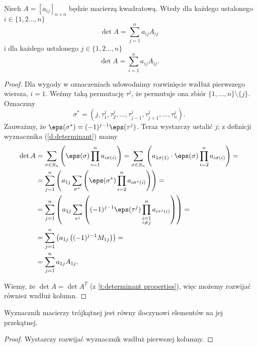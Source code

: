 \begin{theorem}
    \label{t:Laplace}
    Niech $A = [a_{ij}]_{n\times n}$ będzie macierzą kwadratową. Wtedy dla każdego ustalonego $i \in \{1,2\ldots,n\}$
    \[ \det A = \sum_{j=1}^n a_{ij}A_{ij} \]
    i dla każdego ustalonego $j \in \{1,2\ldots,n\}$
    \[ \det A = \sum_{i=1}^n a_{ij}A_{ij}. \]
\end{theorem}
\begin{proof}
    Dla wygody w oznaczeniach udowodnimy rozwinięcie wzdłuż pierwszego wiersza, $i = 1$. Weźmy taką permutację $\tau^j$, że permutuje ona zbiór $\{1, \ldots, n\} \setminus \{j\}$. Oznaczmy
    \[ \sigma^* = (j, \tau^j_1, \tau^j_2, \ldots, \tau^j_{j-1}, \tau^j_{j+1}, \ldots, \tau^j_{n}). \]
    Zauważmy, że $\eps(\sigma^*) = (-1)^{j-1} \eps(\tau^j)$. Teraz wystarczy ustalić $j$; z definicji wyznacznika (\ref{d:determinant}) mamy
    \begin{align*}
        \det A &= \sum_{\sigma\in S_n} \left(\eps(\sigma) \prod_{i=1}^n a_{i\sigma(i)}\right) = \sum_{\sigma\in S_n} \left(a_{1\sigma(1)} \cdot \eps(\sigma) \prod_{i=2}^n a_{i\sigma(i)}\right) = \\
        &= \sum_{j=1}^n \left(a_{1j} \sum_{\sigma^*} \left(\eps(\sigma^*) \prod_{i=2}^n a_{i\sigma^*(i)}\right)\right) = \\
        &= \sum_{j=1}^n \left(a_{1j} \sum_{\tau^j} \left((-1)^{j-1}\eps(\tau^j) \prod_{\substack{i=1\\i\neq j}}^n a_{i\tau^j(i)}\right)\right) = \\
        &= \sum_{j=1}^n \left(a_{1j} \left((-1)^{j-1} M_{1j}\right)\right) = \\
        &= \sum_{j=1}^n a_{1j} A_{1j}.
    \end{align*}

    Wiemy, że $\det A = \det A^T$ (z \ref{t:determinant properties}), więc możemy rozwijać również wzdłuż kolumn.
\end{proof}

\begin{corollary}
    \label{c:determinant in triangular matrix}
    Wyznacznik macierzy trójkątnej jest równy iloczynowi elementów na jej przekątnej.
\end{corollary}
\begin{proof}
    Wystarczy rozwijać wyznacznik wzdłuż pierwszej kolumny.
\end{proof}